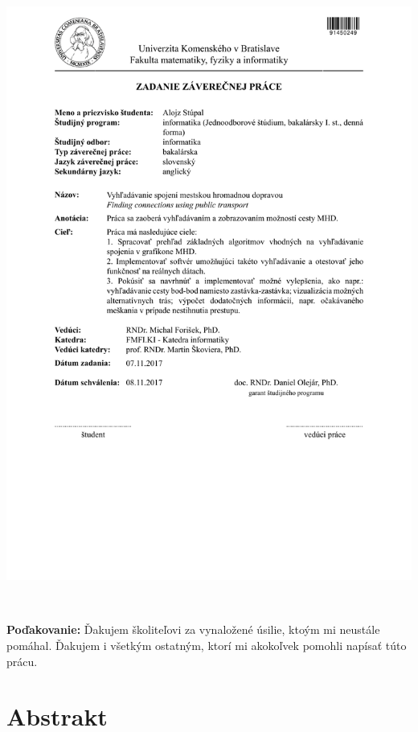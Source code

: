 \documentclass[12pt, oneside]{book}
\begin{document}
\newpage 
\thispagestyle{empty}
\hspace{-2cm}\includegraphics[width=1.1\textwidth]{images/zadanie}


\frontmatter

\setcounter{page}{3}
\newpage 
~

\vfill
{\bf Poďakovanie:} Ďakujem školiteľovi za vynaložené úsilie, ktoým mi neustále pomáhal. Ďakujem i všetkým ostatným, ktorí mi akokoľvek pomohli napísať túto prácu.


\newpage 
\section*{Abstrakt}
\end{document}
